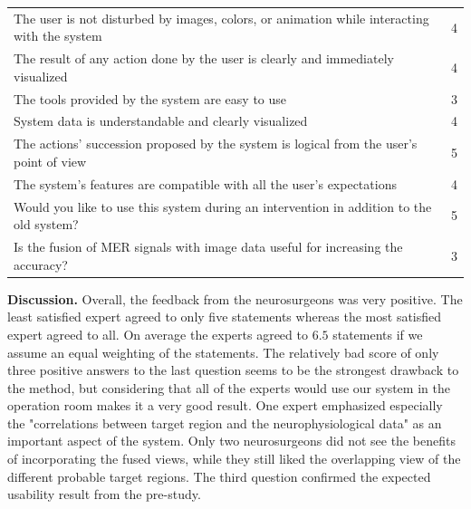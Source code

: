 \documentclass[review]{vgtc}                 %
\begin{document}
\noindent \begin{tabular}{p{} c}
\hline
The user is not disturbed by images, colors, or animation while interacting with the system	& 4\\
The result of any action done by the user is clearly and immediately visualized				& 4\\
The tools provided by the system are easy to use												& 3\\
System data is understandable and clearly visualized											& 4\\
The actions' succession proposed by the system is logical from the user's point of view		& 5\\
The system's features are compatible with all the user's expectations							& 4\\
Would you like to use this system during an intervention in addition to the old system?		& 5\\
Is the fusion of MER signals with image data useful for increasing the accuracy?				& 3\\
\hline
\end{tabular}

\noindent \textbf{Discussion.} Overall, the feedback from the neurosurgeons was very positive. The least satisfied expert agreed to only five statements whereas the most satisfied expert agreed to all. On average the experts agreed to $6.5$ statements if we assume an equal weighting of the statements. The relatively bad score of only three positive answers to the last question seems to be the strongest drawback to the method, but considering that all of the experts would use our system in the operation room makes it a very good result. One expert emphasized especially the "correlations between target region and the neurophysiological data" as an important aspect of the system. Only two neurosurgeons did not see the benefits of incorporating the fused views, while they still liked the overlapping view of the different probable target regions. The third question confirmed the expected usability result from the pre-study.
\end{document}
